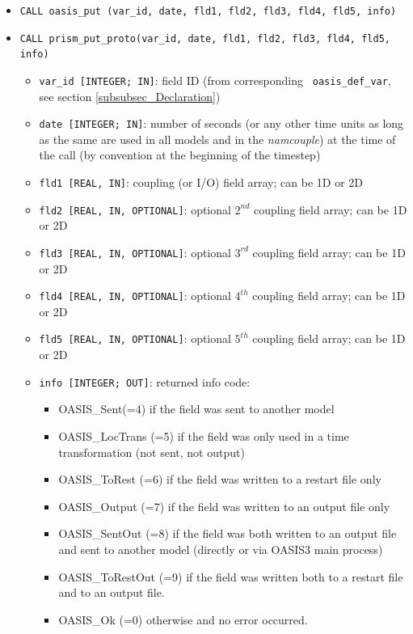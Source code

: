 \begin{itemize}
\item {\tt CALL oasis\_put (var\_id, date, fld1, fld2, fld3, fld4,
    fld5, info)}
\item {\tt CALL prism\_put\_proto(var\_id, date, fld1, fld2, fld3,
    fld4, fld5, info)}
  \begin{itemize}
  \item {\tt var\_id [INTEGER; IN]}: field ID (from corresponding {\tt
      oasis\_def\_var}, see section \ref{subsubsec_Declaration})
  \item {\tt date [INTEGER; IN]}: number of seconds (or any other time
    units as long as the same are used in all models and in the {\it
      namcouple}) at the time of the call (by convention at the
    beginning of the timestep)
  \item {\tt fld1 [REAL, IN]}: coupling (or I/O) field array; can be
    1D or 2D
  \item {\tt fld2 [REAL, IN, OPTIONAL]}: optional $2^{nd}$ coupling
    field array; can be 1D or 2D
  \item {\tt fld3 [REAL, IN, OPTIONAL]}: optional $3^{rd}$ coupling
    field array; can be 1D or 2D
  \item {\tt fld4 [REAL, IN, OPTIONAL]}: optional $4^{th}$ coupling
    field array; can be 1D or 2D
  \item {\tt fld5 [REAL, IN, OPTIONAL]}: optional $5^{th}$ coupling
    field array; can be 1D or 2D
  \item {\tt info [INTEGER; OUT]}: returned info code:
    \begin{itemize}
    \item OASIS\_Sent(=4) if the field was sent to another model
    \item OASIS\_LocTrans (=5) if the field was only used in a time
      transformation (not sent, not output)
    \item OASIS\_ToRest (=6) if the field was written to a restart
      file only
    \item OASIS\_Output (=7) if the field was written to an output
      file only
    \item OASIS\_SentOut (=8) if the field was both written to an
      output file and sent to another model (directly or via OASIS3
      main process)
    \item OASIS\_ToRestOut (=9) if the field was written both to a
      restart file and to an output file.
    \item OASIS\_Ok (=0) otherwise and no error occurred.
    \end{itemize}
  \end{itemize}
\end{itemize}

